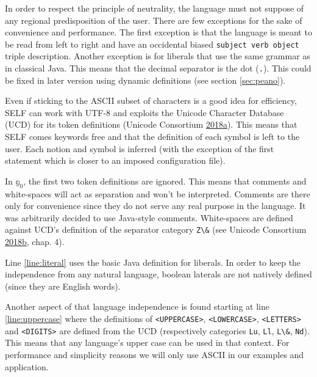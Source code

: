 \documentclass[11pt,a4paper,twoside,openright,titlepage,numbers=noenddot,headinclude,cleardoublepage=empty,openany]{scrreprt}
\theoremstyle{plain}
\theoremstyle{definition}
\theoremstyle{remark}
\newcommand{\passthrough}[1]{#1}
\newcommand{\bb}{\mathbb}
\begin{document}
In order to respect the principle of neutrality, the language must not
suppose of any regional predisposition of the user. There are few
exceptions for the sake of convenience and performance. The first
exception is that the language is meant to be read from left to right
and have an occidental biased
\passthrough{\lstinline!subject verb object!} triple description.
Another exception is for liberals that use the same grammar as in
classical Java. This means that the decimal separator is the dot
(\passthrough{\lstinline!.!}). This could be fixed in later version
using dynamic definitions (see section \ref{sec:peano}).

Even if sticking to the ASCII subset of characters is a good idea for
efficiency, SELF can work with UTF-8 and exploits the Unicode Character
Database (UCD) for its token definitions (Unicode Consortium
\protect\hyperlink{ref-unicodeconsortium_unicode_2018}{2018}\protect\hyperlink{ref-unicodeconsortium_unicode_2018}{a}).
This means that SELF comes keywords free and that the definition of each
symbol is left to the user. Each notion and symbol is inferred (with the
exception of the first statement which is closer to an imposed
configuration file).

In \(\bb{g}_0\), the first two token definitions are ignored. This means
that comments and white-spaces will act as separation and won't be
interpreted. Comments are there only for convenience since they do not
serve any real purpose in the language. It was arbitrarily decided to
use Java-style comments. White-spaces are defined against UCD's
definition of the separator category \passthrough{\lstinline!Z\&!} (see
Unicode Consortium
\protect\hyperlink{ref-unicodeconsortium_unicode_2018a}{2018}\protect\hyperlink{ref-unicodeconsortium_unicode_2018a}{b},
chap. 4).

Line \ref{line:literal} uses the basic Java definition for liberals. In
order to keep the independence from any natural language, boolean
laterals are not natively defined (since they are English words).

Another aspect of that language independence is found starting at
line \ref{line:uppercase} where the definitions of
\passthrough{\lstinline!<UPPERCASE>!},
\passthrough{\lstinline!<LOWERCASE>!},
\passthrough{\lstinline!<LETTERS>!} and
\passthrough{\lstinline!<DIGITS>!} are defined from the UCD
(respectively categories \passthrough{\lstinline!Lu!},
\passthrough{\lstinline!Ll!}, \passthrough{\lstinline!L\&!},
\passthrough{\lstinline!Nd!}). This means that any language's upper case
can be used in that context. For performance and simplicity reasons we
will only use ASCII in our examples and application.
\end{document}
